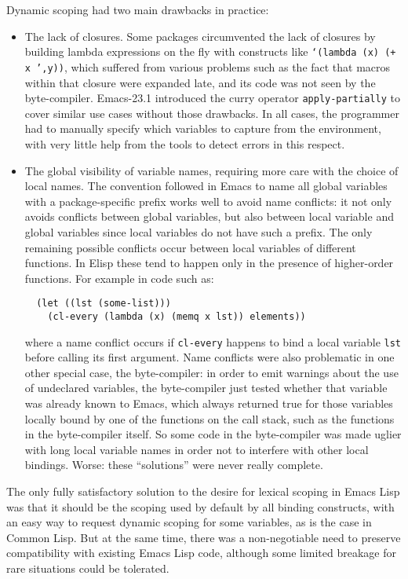 \documentclass[format=acmsmall, review]{acmart}
\newcommand \Elisp {Emacs Lisp}
\begin{document}
Dynamic scoping had two main drawbacks in practice:
\begin{itemize}
\item The lack of closures.
  Some packages circumvented the lack of closures
  by building lambda expressions on the fly with constructs like
  \texttt{`(lambda (x) (+ x ',y))}, which suffered from various problems
  such as the fact that macros within that closure were expanded late, and
  its code was not seen by the byte-compiler.  Emacs-23.1 introduced the
  curry operator \texttt{apply-partially} to cover similar use cases without
  those drawbacks.  In all cases, the programmer had to manually specify
  which variables to capture from the environment, with very little help
  from the tools to detect errors in this respect.
\item The global visibility of variable names, requiring more care with the
  choice of local names.  The convention followed in Emacs to name all
  global variables with a package-specific prefix works well to avoid name
  conflicts: it not only avoids conflicts between global variables, but also
  between local variable and global variables since local variables do not
  have such a prefix.  The only remaining possible conflicts occur between
  local variables of different functions.  In Elisp these tend to happen only
  in the presence of higher-order functions.  For example in code such as:
\begin{verbatim}
  (let ((lst (some-list)))
    (cl-every (lambda (x) (memq x lst)) elements))
\end{verbatim}
  where a name conflict occurs if \texttt{cl-every} happens to bind a local
  variable \texttt{lst} before calling its first argument.  Name conflicts
  were also problematic in one other special case, the byte-compiler: in
  order to emit warnings about the use of undeclared variables, the
  byte-compiler just tested whether that variable was already known to
  Emacs, which always returned true for those variables locally bound by one
  of the functions on the call stack, such as the functions in the
  byte-compiler itself.  So some code in the byte-compiler was made uglier
  with long local variable names in order not to interfere with other local
  bindings.  Worse: these ``solutions'' were never really complete.
\end{itemize}
The only fully satisfactory solution to the desire for lexical scoping in
\Elisp{} was that it should be the scoping used by default by all binding
constructs, with an easy way to request dynamic scoping for some
variables, as is the case in Common Lisp.  But at the same time, there was
a non-negotiable need to preserve compatibility with existing \Elisp{} code,
although some limited breakage for rare situations could be tolerated.
\end{document}
